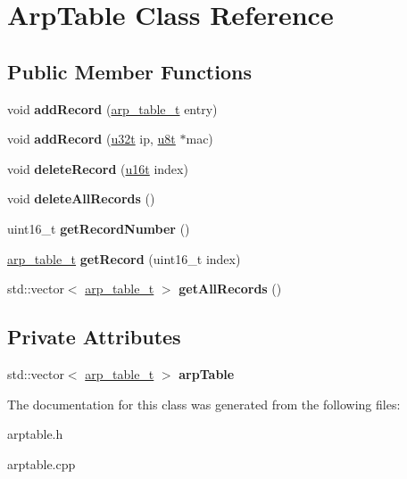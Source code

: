 \hypertarget{classArpTable}{}\section{Arp\+Table Class Reference}
\label{classArpTable}
\subsection*{Public Member Functions}
\begin{DoxyCompactItemize}
\item 
\mbox{\label{classArpTable_a73005ba2b1e7a304ca8e52fc248fa088}} 
void {\bfseries add\+Record} (\hyperlink{structarp__table__t}{arp\+\_\+table\+\_\+t} entry)
\item 
\mbox{\label{classArpTable_a50ff8a76494c612b9d9a3e0959a22319}} 
void {\bfseries add\+Record} (\hyperlink{macros_8h_a464a07ed2c6d005d677113cc44750a64}{u32t} ip, \hyperlink{macros_8h_a176a4ab0531a048e0693a4520c550193}{u8t} $\ast$mac)
\item 
\mbox{\label{classArpTable_a82253f8a60a10ccf891523af60127107}} 
void {\bfseries delete\+Record} (\hyperlink{macros_8h_a590a9a8f7df8fabfac6573e21da1922d}{u16t} index)
\item 
\mbox{\label{classArpTable_a2caff3ffc36cabf9a3bfc08791fc54c3}} 
void {\bfseries delete\+All\+Records} ()
\item 
\mbox{\label{classArpTable_a7ccaac9af85787a5d0ac606e7f35d68c}} 
uint16\+\_\+t {\bfseries get\+Record\+Number} ()
\item 
\mbox{\label{classArpTable_a74f045fa2052bfd3d54a61369862e434}} 
\hyperlink{structarp__table__t}{arp\+\_\+table\+\_\+t} {\bfseries get\+Record} (uint16\+\_\+t index)
\item 
\mbox{\label{classArpTable_ae546c9a5a0a1711caa273c62840cc04c}} 
std\+::vector$<$ \hyperlink{structarp__table__t}{arp\+\_\+table\+\_\+t} $>$ {\bfseries get\+All\+Records} ()
\end{DoxyCompactItemize}
\subsection*{Private Attributes}
\begin{DoxyCompactItemize}
\item 
\mbox{\label{classArpTable_a81b942abf2c4e35ca7790939595f59b3}} 
std\+::vector$<$ \hyperlink{structarp__table__t}{arp\+\_\+table\+\_\+t} $>$ {\bfseries arp\+Table}
\end{DoxyCompactItemize}


The documentation for this class was generated from the following files\+:\begin{DoxyCompactItemize}
\item 
arptable.\+h\item 
arptable.\+cpp\end{DoxyCompactItemize}
